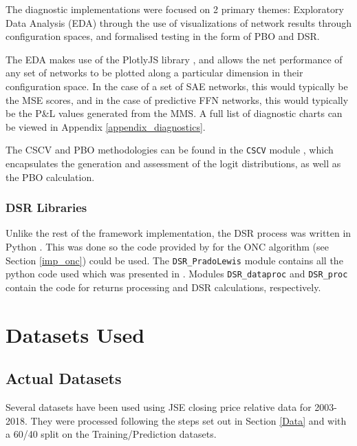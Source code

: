 \documentclass[a4paper,11pt,oneside]{article}
\theoremstyle{plain}
\theoremstyle{definition}
\begin{document}
	The diagnostic implementations were focused on 2 primary themes: Exploratory Data Analysis (EDA) through the use of visualizations of network results through configuration spaces, and formalised testing in the form of PBO and DSR.
	
	The EDA makes use of the PlotlyJS library \citep{PlotlyJS}, and allows the net performance of any set of networks to be plotted along a particular dimension in their configuration space. In the case of a set of SAE networks, this would typically be the MSE scores, and in the case of predictive FFN networks, this would typically be the P\&L values generated from the MMS. A full list of diagnostic charts can be viewed in Appendix \ref{appendix_diagnostics}. \newline
	
	The CSCV and PBO methodologies can be found in the \texttt{CSCV} module \citep{DCCSCV}, which encapsulates the generation and assessment of the logit distributions, as well as the PBO calculation.
	
	\subsubsection{DSR Libraries}
	
	Unlike the rest of the framework implementation, the DSR process was written in Python \citep{Python}. This was done so the code provided by \citet{PradoDSR} for the ONC algorithm (see Section \ref{imp_onc}) could be used. The \texttt{DSR\_PradoLewis} module \citep{DCDSR_PradoLewis} contains all the python code used which was presented in \citep{PradoDSR}. Modules \texttt{DSR\_dataproc} \citep{DCDSR_Dataproc} and \texttt{DSR\_proc} \citep{DCDSR_proc} contain the code for returns processing and DSR calculations, respectively.
	
	\newpage
	\section{Datasets Used}\label{Datasets}
	
	\subsection{Actual Datasets}
	
	Several datasets have been used using JSE closing price relative data for 2003-2018. They were processed following the steps set out in Section \ref{Data} and with a 60/40 split on the Training/Prediction datasets.
	
\end{document}

